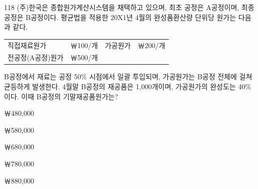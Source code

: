 \begin{question}{118}
(주)한국은 종합원가계산시스템을 채택하고 있으며, 최초 공정은 A공정이며, 최종 공정은 B공정이다. 평균법을 적용한 20X1년 4월의 완성품환산량 단위당 원가는 다음과 같다.

{\small\centering
\begin{tabular}{lrlr}
\hline
직접재료원가 & ￦100/개 & 가공원가 & ￦200/개 \\
전공정(A공정)원가 & ￦500/개 & & \\
\hline
\end{tabular}
\par}

B공정에서 재료는 공정 50\% 시점에서 일괄 투입되며, 가공원가는 B공정 전체에 걸쳐 균등하게 발생한다. 4월말 B공정의 재공품은 1,000개이며, 가공원가의 완성도는 40\%이다. 이때 B공정의 기말재공품원가는? \par
\begin{choices}
  \item ￦480,000
  \item ￦580,000
  \item ￦680,000
  \item ￦780,000
  \item ￦880,000
\end{choices}
\end{question}

